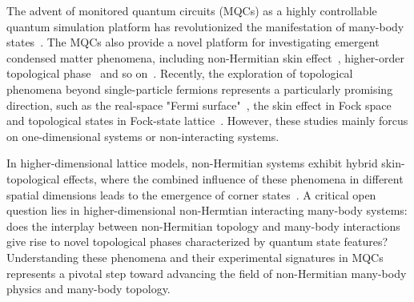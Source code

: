 \documentclass[longbibliography, aps, prx, amsmath, amssymb, amsfonts, twocolumn,superscriptaddress, footinbib]{revtex4-1}
\begin{document}
	The advent of monitored quantum circuits (MQCs) as a highly controllable quantum simulation platform has revolutionized the manifestation of many-body states~\cite{skinner2019measurement,nahum2017quantum,gullans2020dynamical,koh2023measurement,li2023cross,choi2020quantum,minato2022fate,yang2025bridging,potter2022entanglement,iqbal2024non,zhang2025physics}. 
	The MQCs also provide a novel platform for investigating emergent condensed matter phenomena, including non-Hermitian skin effect~\cite{fleckenstein2022non}, higher-order topological phase~\cite{koh2024realization} and so on~\cite{iqbal2024non}. Recently, the exploration of topological phenomena beyond single-particle fermions represents a particularly promising direction, such as the real-space "Fermi surface"~\cite{shen2025observation}, the skin effect in Fock space~\cite{shen2024enhanced,shimomura2024general} and  topological states in Fock-state lattice~\cite{deng2022observing}. However, these studies mainly forcus on one-dimensional systems or non-interacting systems. 

	In higher-dimensional lattice models, non-Hermitian systems exhibit hybrid skin-topological effects, where the combined influence of these phenomena in different spatial dimensions leads to the emergence of corner states~\cite{lee2019hybrid,zou2021observation,RN1221}.
	A critical open question lies in higher-dimensional non-Hermtian interacting many-body systems: does the interplay between non-Hermitian topology and many-body interactions give rise to novel topological phases characterized by quantum state features? 
	Understanding these phenomena and their experimental signatures in MQCs represents a pivotal step toward advancing the field of non-Hermitian many-body physics and many-body topology. 
\end{document}
